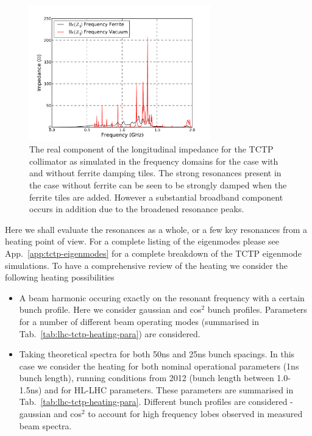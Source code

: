 \begin{figure}
\begin{center}
\includegraphics[width=0.7\textwidth]{LHC_Collimation_Upgrades/figures/longitudinal-impedance-tctp-ferr-freq-dom.pdf}
\end{center}
\label{fig:long-imp-tctp-freq}
\caption{The real component of the longitudinal impedance for the TCTP collimator as simulated in the frequency domains for the case with and without ferrite damping tiles. The strong resonances present in the case without ferrite can be seen to be strongly damped when the ferrite tiles are added. However a substantial broadband component occurs in addition due to the broadened resonance peaks.}
\end{figure}

Here we shall evaluate the resonances as a whole, or a few key resonances from a heating point of view. For a complete listing of the eigenmodes please see App.~\ref{app:tctp-eigenmodes} for a complete breakdown of the TCTP eigenmode simulations. To have a comprehensive review of the heating we consider the following heating possibilities

\begin{itemize}
\item{A beam harmonic occuring exactly on the resonant frequency with a certain bunch profile. Here we consider gaussian and cos$^{2}$ bunch profiles. Parameters for a number of different beam operating modes (summarised in Tab.~\ref{tab:lhc-tctp-heating-para}) are considered.}
\item{Taking theoretical spectra for both 50ns and 25ns bunch spacings. In this case we consider the heating for both nominal operational parameters (1ns bunch length), running conditions from 2012 (bunch length between 1.0-1.5ns) and for HL-LHC parameters. These parameters are summarised in Tab.~\ref{tab:lhc-tctp-heating-para}. Different bunch profiles are considered - gaussian and cos$^{2}$ to account for high frequency lobes observed in measured beam spectra.}
\end{itemize}

